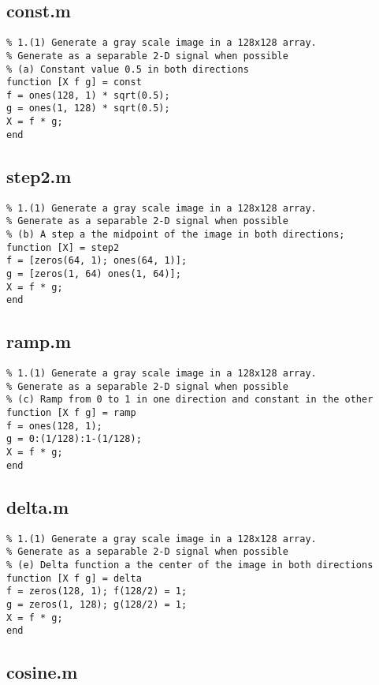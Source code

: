 \documentclass[article,oneside]{memoir}
\begin{document}
\subsection{const.m}

\begin{verbatim}
% 1.(1) Generate a gray scale image in a 128x128 array. 
% Generate as a separable 2-D signal when possible
% (a) Constant value 0.5 in both directions
function [X f g] = const
f = ones(128, 1) * sqrt(0.5);
g = ones(1, 128) * sqrt(0.5);
X = f * g;
end
\end{verbatim}

\subsection{step2.m}

\begin{verbatim}
% 1.(1) Generate a gray scale image in a 128x128 array. 
% Generate as a separable 2-D signal when possible
% (b) A step a the midpoint of the image in both directions;
function [X] = step2
f = [zeros(64, 1); ones(64, 1)];
g = [zeros(1, 64) ones(1, 64)];
X = f * g;
end
\end{verbatim}

\subsection{ramp.m}

\begin{verbatim}
% 1.(1) Generate a gray scale image in a 128x128 array. 
% Generate as a separable 2-D signal when possible
% (c) Ramp from 0 to 1 in one direction and constant in the other
function [X f g] = ramp
f = ones(128, 1);
g = 0:(1/128):1-(1/128);
X = f * g;
end
\end{verbatim}

\subsection{delta.m}

\begin{verbatim}
% 1.(1) Generate a gray scale image in a 128x128 array. 
% Generate as a separable 2-D signal when possible
% (e) Delta function a the center of the image in both directions
function [X f g] = delta
f = zeros(128, 1); f(128/2) = 1;
g = zeros(1, 128); g(128/2) = 1;
X = f * g;
end
\end{verbatim}

\subsection{cosine.m}
\end{document}
